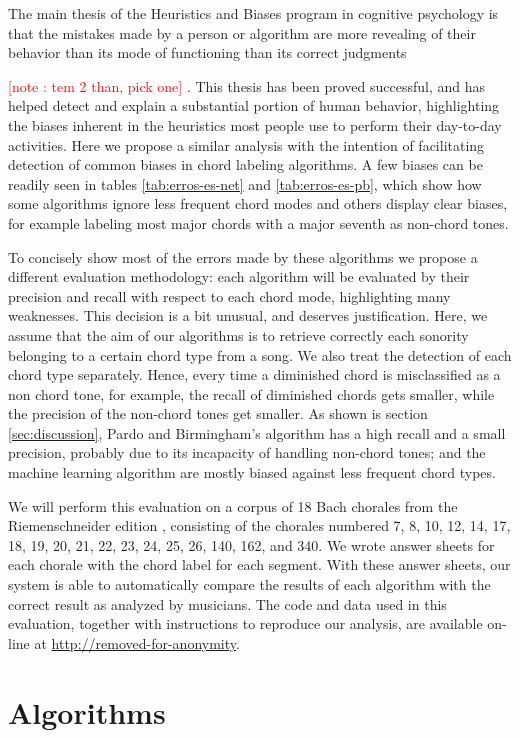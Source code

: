 \documentclass{article}
\newcounter{notecounter}
\newcommand{\note}[1]{
  \addtocounter{notecounter}{1}
  \textcolor{red}{[note \arabic{notecounter}: #1]}
}
\begin{document}
The main thesis of the Heuristics and Biases program in cognitive
psychology is that the mistakes made by a person or algorithm are more
revealing of their behavior than its mode of functioning than its
correct judgments \cite{gilovich.ea02:heuristics} \note{tem 2 than,
  pick one}. This thesis has been proved successful, and has helped
detect and explain a substantial portion of human behavior,
highlighting the biases inherent in the heuristics most people use to
perform their day-to-day activities. Here we propose a similar
analysis with the intention of facilitating detection of common biases
in chord labeling algorithms. A few biases can be readily seen in
tables \ref{tab:erros-es-net} and \ref{tab:erros-es-pb}, which show
how some algorithms ignore less frequent chord modes and others
display clear biases, for example labeling most major chords with a
major seventh as non-chord tones.

To concisely show most of the errors made by these algorithms we
propose a different evaluation methodology: each algorithm will be
evaluated by their precision and recall with respect to each chord
mode, highlighting many weaknesses. This decision is a bit unusual,
and deserves justification. Here, we assume that the aim of our
algorithms is to retrieve correctly each sonority belonging to a
certain chord type from a song. We also treat the detection of each
chord type separately. Hence, every time a diminished chord is
misclassified as a non chord tone, for example, the recall of
diminished chords gets smaller, while the precision of the non-chord
tones get smaller. As shown is section \ref{sec:discussion}, Pardo and
Birmingham's algorithm has a high recall and a small precision,
probably due to its incapacity of handling non-chord tones; and the
machine learning algorithm are mostly biased against less frequent
chord types.

We will perform this evaluation on a corpus of 18 Bach chorales from
the Riemenschneider edition \cite{bach41:371}, consisting of the
chorales numbered 7, 8, 10, 12, 14, 17, 18, 19, 20, 21, 22, 23, 24,
25, 26, 140, 162, and 340. We wrote answer sheets for each chorale
with the chord label for each segment. With these answer sheets, our
system is able to automatically compare the results of each algorithm
with the correct result as analyzed by musicians. The code and data
used in this evaluation, together with instructions to reproduce our
analysis, are available on-line at \url{http://removed-for-anonymity}.

\section{Algorithms}
\label{sec:algorithms}
\end{document}
